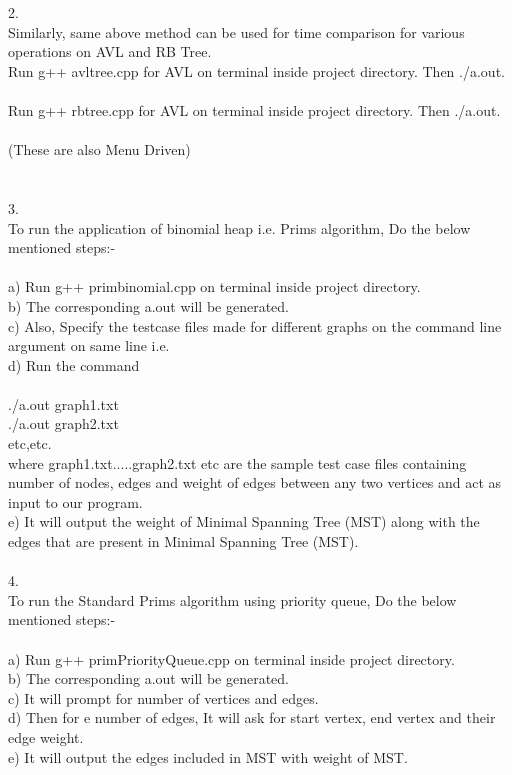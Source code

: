 \documentclass[10pt,a4paper]{article}
\begin{document}
2. \\Similarly, same above method can be used for time comparison for various operations on AVL and RB Tree.\\ 
Run g++ avltree.cpp for AVL on terminal inside project directory. Then ./a.out.\\ \\ 
Run g++ rbtree.cpp for AVL on terminal inside project directory. Then ./a.out.\\ \\ 
(These are also Menu Driven) \\ \\ \\

3. \\To run the application of binomial heap i.e. Prims algorithm, Do the below mentioned steps:- \\ \\a) Run g++ primbinomial.cpp on terminal inside project directory.\\
b) The corresponding a.out will be generated. \\
c) Also, Specify the testcase files made for different graphs on the command line argument on same line i.e. \\
d) Run the command\\ \\
./a.out graph1.txt\\
./a.out graph2.txt\\ etc,etc. \\

where graph1.txt.....graph2.txt etc are the sample test case files containing number of nodes, edges and weight of edges between any two vertices and act as input to our program. \\

e) It will output the weight of Minimal Spanning Tree (MST) along with the edges that are present in Minimal Spanning Tree (MST). \\ \\

4. \\To run the Standard Prims algorithm using priority queue, Do the below mentioned steps:- \\ \\a) Run g++ primPriorityQueue.cpp on terminal inside project directory.\\
b) The corresponding a.out will be generated. \\
c) It will prompt for number of vertices and edges. \\
d) Then for e number of edges, It will ask for start vertex, end vertex and their edge weight. \\
e) It will output the edges included in MST with weight of MST.\\ \\
\end{document}

